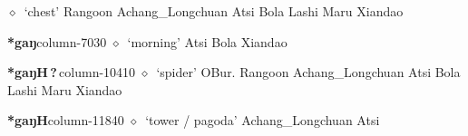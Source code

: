          $\diamond$~`chest'
         Rangoon 
\hspace{1ex}
         Achang\_Longchuan 
\hspace{1ex}
         Atsi 
\hspace{1ex}
         Bola 
\hspace{1ex}
         Lashi 
\hspace{1ex}
         Maru 
\hspace{1ex}
         Xiandao 
  \item {\footnotesize \textbf{*gaŋ}}{\tiny column-7030}
         $\diamond$~`morning'
         Atsi 
\hspace{1ex}
         Bola 
\hspace{1ex}
         Xiandao 
  \item {\footnotesize \textbf{*gaŋH\,?\,}}{\tiny column-10410}
         $\diamond$~`spider'
         OBur. 
\hspace{1ex}
         Rangoon 
\hspace{1ex}
         Achang\_Longchuan 
\hspace{1ex}
         Atsi 
\hspace{1ex}
         Bola 
\hspace{1ex}
         Lashi 
\hspace{1ex}
         Maru 
\hspace{1ex}
         Xiandao 
  \item {\footnotesize \textbf{*gaŋH}}{\tiny column-11840}
         $\diamond$~`tower / pagoda'
         Achang\_Longchuan 
\hspace{1ex}
         Atsi 
\hspace{1ex}
